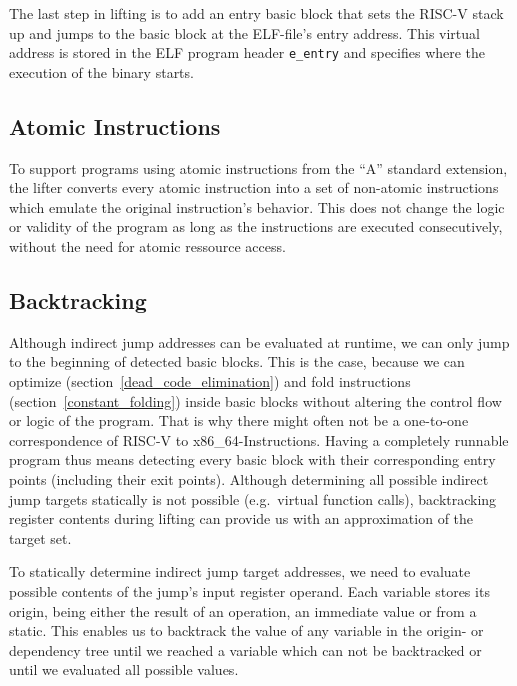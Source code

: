 \documentclass[course=eragp]{aspdoc}
\begin{document}
\par

The last step in lifting is to add an entry basic block that sets the RISC-V stack up and jumps to the
basic block at the ELF-file's entry address. This virtual address is stored in the ELF program header
\texttt{e\_entry} and specifies where the execution of the binary starts.\cite{elf_spec}

\subsection{Atomic Instructions}

To support programs using atomic instructions from the ``A'' standard extension, the lifter converts
every atomic instruction into a set of non-atomic instructions which emulate the original
instruction's behavior. This does not change the logic or validity of the program as long as the
instructions are executed consecutively, without the need for atomic ressource access.


\subsection{Backtracking}\label{backtracking}
Although indirect jump addresses can be evaluated at runtime, we can only jump to the beginning of
detected basic blocks. This is the case, because we can optimize (section~\ref{dead_code_elimination}) and fold
instructions (section~\ref{constant_folding}) inside basic blocks without altering the control flow or
logic of the program. That is why there might often not be a one-to-one correspondence of RISC-V to x86\_64-Instructions.
Having a completely runnable program thus means detecting every basic block
with their corresponding entry points (including their exit points). Although determining all possible
indirect jump targets statically is not possible (e.g.\ virtual function calls),
backtracking register contents during lifting can provide us with
an approximation of the target set.

\par

To statically determine indirect jump target addresses, we need to evaluate possible contents of
the jump's input register operand. Each variable stores its origin, being either the result of an
operation, an immediate value or from a static. This enables us to backtrack the value of
any variable in the origin- or dependency tree until we reached a variable which can not be backtracked or until we evaluated
all possible values.
\end{document}
